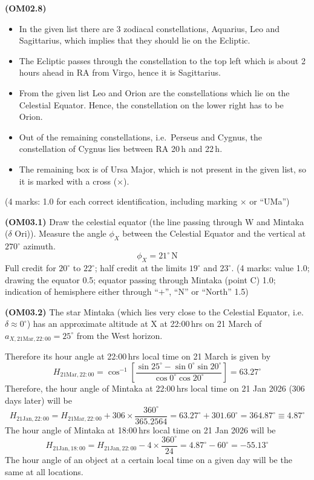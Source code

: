 \textbf{(OM02.8)}
\begin{itemize}
\item In the given list there are 3 zodiacal constellations, Aquarius, Leo
  and Sagittarius, which implies that they should lie on the Ecliptic.
\item The Ecliptic passes through the constellation to the top left which is
  about 2 hours ahead in RA from Virgo, hence it is Sagittarius.
\item From the given list Leo and Orion are the constellations which lie on
  the Celestial Equator. Hence, the constellation on the lower right has to
  be Orion.
\item Out of the remaining constellations, i.e.\ Perseus and Cygnus, the
  constellation of Cygnus lies between RA 20\,h and 22\,h.
\item The remaining box is of Ursa Major, which is not present in the given
  list, so it is marked with a cross ($\times$).
\end{itemize}
\hfill(4 marks: 1.0 for each correct identification, including marking
$\times$ or ``UMa'')


\textbf{(OM03.1)} Draw the celestial equator (the line passing through W and
Mintaka ($\delta$ Ori)). Measure the angle $\phi_X$ between the Celestial
Equator and the vertical at $270^\circ$ azimuth.
\[ \phi_X = 21^\circ\,\mathrm{N} \]
Full credit for $20^\circ$ to $22^\circ$; half credit at the limits
$19^\circ$ and $23^\circ$. \hfill(4 marks: value 1.0; drawing the equator
0.5; equator passing through Mintaka (point C) 1.0; indication of
hemisphere either through ``$+$'', ``N'' or ``North'' 1.5)


\textbf{(OM03.2)} The star Mintaka (which lies very close to the Celestial
Equator, i.e.\ $\delta \approx 0^\circ$) has an approximate altitude at X at
22:00\,hrs on 21 March of $a_{X,\mathrm{21Mar},22:00} = 25^\circ$ from the
West horizon.

Therefore its hour angle at 22:00\,hrs local time on 21 March is given by
\[ H_{\mathrm{21Mar},22:00}
   = \cos^{-1}\!\left[\frac{\sin 25^\circ - \sin 0^\circ \sin 20^\circ}
                           {\cos 0^\circ \cos 20^\circ}\right]
   = 63.27^\circ \]
Therefore, the hour angle of Mintaka at 22:00\,hrs local time on 21 Jan 2026
(306 days later) will be
\[ H_{\mathrm{21Jan},22:00}
   = H_{\mathrm{21Mar},22:00} + 306 \times \frac{360^\circ}{365.2564}
   = 63.27^\circ + 301.60^\circ = 364.87^\circ \equiv 4.87^\circ \]
The hour angle of Mintaka at 18:00\,hrs local time on 21 Jan 2026 will be
\[ H_{\mathrm{21Jan},18:00}
   = H_{\mathrm{21Jan},22:00} - 4 \times \frac{360^\circ}{24}
   = 4.87^\circ - 60^\circ = -55.13^\circ \]
The hour angle of an object at a certain local time on a given day will be
the same at all locations.

